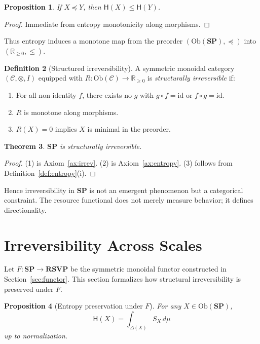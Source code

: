 \documentclass[12pt,a4paper]{article}
\newtheorem{theorem}{Theorem}[section]
\newtheorem{proposition}[theorem]{Proposition}
\theoremstyle{definition}
\newtheorem{definition}[theorem]{Definition}
\theoremstyle{remark}
\newcommand{\Ent}{\mathsf{H}}
\newcommand{\SP}{\mathbf{SP}}
\newcommand{\RSVP}{\mathbf{RSVP}}
\newcommand{\Ob}{\mathrm{Ob}}
\newcommand{\id}{\mathrm{id}}
\begin{document}
\begin{proposition}
If $X \preceq Y$, then $\Ent(X) \le \Ent(Y)$.
\end{proposition}

\begin{proof}
Immediate from entropy monotonicity along morphisms.
\end{proof}

Thus entropy induces a monotone map from the preorder $(\Ob(\SP),\preceq)$
into $(\mathbb{R}_{\ge 0},\le)$.

\begin{definition}[Structured irreversibility]
A symmetric monoidal category $(\mathcal{C},\otimes,I)$ equipped with
$R : \Ob(\mathcal{C}) \to \mathbb{R}_{\ge 0}$ is
\emph{structurally irreversible} if:
\begin{enumerate}
  \item For all non-identity $f$, there exists no $g$ with
        $g\circ f=\id$ or $f\circ g=\id$.
  \item $R$ is monotone along morphisms.
  \item $R(X)=0$ implies $X$ is minimal in the preorder.
\end{enumerate}
\end{definition}

\begin{theorem}
$\SP$ is structurally irreversible.
\end{theorem}

\begin{proof}
(1) is Axiom~\ref{ax:irrev}.  
(2) is Axiom~\ref{ax:entropy}.  
(3) follows from Definition~\ref{def:entropy}(i).  
\end{proof}

Hence irreversibility in $\SP$ is not an emergent phenomenon but a
categorical constraint. The resource functional does not merely measure
behavior; it defines directionality.

\section{Irreversibility Across Scales}
\label{sec:scale}

Let $F : \SP \to \RSVP$ be the symmetric monoidal functor constructed
in Section~\ref{sec:functor}. This section formalizes how structural
irreversibility is preserved under $F$.

\begin{proposition}[Entropy preservation under $F$]
For any $X \in \Ob(\SP)$,
\[
  \Ent(X) = \int_{\Delta(X)} S_X \, d\mu
\]
up to normalization.
\end{proposition}
\end{document}
